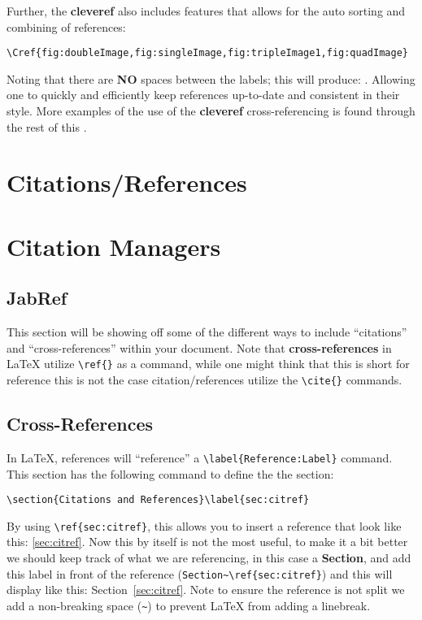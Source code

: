 		Further, the \textbf{cleveref} also includes features that allows for the auto sorting and combining of references:
		\begin{lstlisting}[style=LaTeXStyle]
			\Cref{fig:doubleImage,fig:singleImage,fig:tripleImage1,fig:quadImage}
		\end{lstlisting}
		Noting that there are \textbf{NO} spaces between the labels; this will produce: . 
		Allowing one to quickly and efficiently keep references up-to-date and consistent in their style.
		More examples of the use of the \textbf{cleveref} cross-referencing is found through the rest of this .
	\section{Citations/References}
		
	
	\section{Citation Managers}
		
		\subsection{JabRef}
			
	
	This section will be showing off some of the different ways to include \enquote{citations} and \enquote{cross-references} within your document.
		Note that \textbf{cross-references} in \LaTeX{} utilize \lstinline|\ref{}| as a command, while one might think that this is short for reference this is not the case citation/references utilize the \lstinline|\cite{}| commands.
		\subsection{Cross-References}\label{subsec:cross-reference}
			In \LaTeX{}, references will \enquote{reference} a \lstinline|\label{Reference:Label}| command. 
			This section has the following command to define the the section:
			\begin{Center}
				\lstinline|\section{Citations and References}\label{sec:citref}|
			\end{Center}
			By using \lstinline|\ref{sec:citref}|, this allows you to insert a reference that look like this: \ref{sec:citref}.
			Now this by itself is not the most useful, to make it a bit better we should keep track of what we are referencing, in this case a \textbf{Section}, and add this label in front of the reference (\lstinline|Section~\ref{sec:citref}|) and this will display like this: Section~\ref{sec:citref}.
			Note to ensure the reference is not split we add a non-breaking space (\lstinline|~|) to prevent \LaTeX{} from adding a linebreak.

